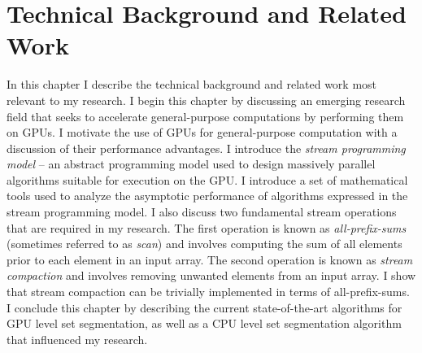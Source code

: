 \fancyhead[RO,LE]{\thepage}
\fancyfoot{} 
\chapter{Technical Background and Related Work}
\label{chapter:background}

In this chapter I describe the technical background and related work most relevant to my research. I begin this chapter  by discussing an emerging research field that seeks to accelerate general-purpose computations by performing them on GPUs. I motivate the use of GPUs for general-purpose computation with a discussion of their performance advantages. I introduce the \emph{stream programming model} -- an abstract programming model used to design massively parallel algorithms suitable for execution on the GPU. I introduce a set of mathematical tools used to analyze the asymptotic performance of algorithms expressed in the stream programming model. I also discuss two fundamental stream operations that are required in my research. The first operation is known as \emph{all-prefix-sums} (sometimes referred to as \emph{scan}) and involves computing the sum of all elements prior to each element in an input array. The second operation is known as \emph{stream compaction} and involves removing unwanted elements from an input array. I show that stream compaction can be trivially  implemented in terms of all-prefix-sums. I conclude this chapter by describing the current state-of-the-art algorithms for GPU level set segmentation, as well as a CPU level set segmentation algorithm that influenced my research.

